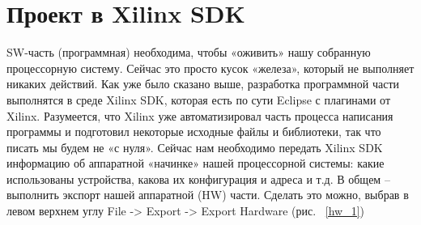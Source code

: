 \documentclass[a4paper,oneside ,10pt]{extreport}
\begin{document}
\section{Проект в Xilinx SDK}

SW-часть (программная) необходима, чтобы «оживить» нашу собранную 
процессорную систему. Сейчас это просто кусок «железа», который не выполняет 
никаких действий. Как уже было сказано выше, разработка программной части 
выполнятся в среде Xilinx SDK, которая есть по сути Eclipse с плагинами от Xilinx. 
Разумеется, что Xilinx уже автоматизировал часть процесса написания программы и 
подготовил некоторые исходные файлы и библиотеки, так что писать мы будем не 
«с нуля». Сейчас нам необходимо передать Xilinx SDK информацию об аппаратной 
«начинке» нашей процессорной системы: какие использованы устройства, какова их 
конфигурация и адреса и т.д. В общем – выполнить экспорт нашей аппаратной (HW) 
части. Сделать это можно, выбрав в левом верхнем углу File -> Export -> Export Hardware
(рис. ~\ref{hw_1})
\end{document}
